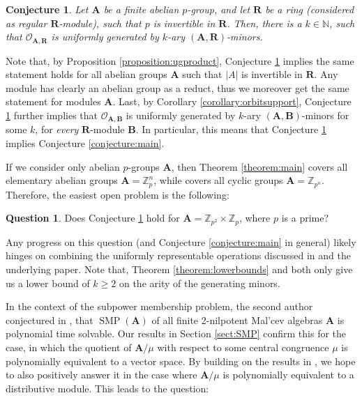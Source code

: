 \documentclass[11pt]{amsart}
\theoremstyle{plain}
\newtheorem{conjecture}[thm]{Conjecture}
\theoremstyle{definition}
\newtheorem{question}[thm]{Question}
\newcommand{\N}{{\mathbb N}}
\newcommand{\Z}{{\mathbb Z}}
\newcommand{\alg}[1]{\mathbf{#1}}
\newcommand{\clonoid}[1]{\mathcal{#1}}
\newcommand{\clodO}{\clonoid{O}}
\newcommand{\algA}{\alg{A}}
\newcommand{\algB}{\alg{B}}
\newcommand{\algR}{\alg{R}}
\DeclareMathOperator{\SMP}{SMP}
\begin{document}
\begin{conjecture} \label{conjecture:strong}
Let $\algA$ be a finite abelian $p$-group, and let $\algR$ be a ring (considered as regular $\algR$-module), such that $p$ is invertible in $\algR$. Then, there is a $k\in \N$, such that $\mathcal O_{\algA,\algR}$ is uniformly generated by $k$-ary $(\algA,\algR)$-minors.
\end{conjecture}

Note that, by Proposition \ref{proposition:ugproduct}, Conjecture \ref{conjecture:strong} implies the same statement holds for all abelian groups $\algA$ such that $|A|$ is invertible in $\algR$. Any module has clearly an abelian group as a reduct, thus we moreover get the same statement for modules $\algA$. Last, by Corollary \ref{corollary:orbitsupport}, Conjecture \ref{conjecture:strong} further implies that $\clodO_{\algA,\algB}$ is uniformly generated by $k$-ary $(\algA,\algB)$-minors for some $k$, for \emph{every} $\algR$-module $\algB$. In particular, this means that Conjecture \ref{conjecture:strong} implies Conjecture \ref{conjecture:main}.

If we consider only abelian $p$-groups $\algA$, then Theorem \ref{theorem:main} covers all elementary abelian groups $\algA = \Z_p^n$, while \cite{MW-clonoidsmodules} covers all cyclic groups $\algA = \Z_{p^n}$. Therefore, the easiest open problem is the following:

\begin{question} \label{question:pgroup}
Does Conjecture \ref{conjecture:strong} hold for $\algA = \Z_{p^2}\times \Z_p$, where $p$ is a prime?
\end{question}

Any progress on this question (and Conjecture \ref{conjecture:main} in general) likely hinges on combining the uniformly representable operations discussed in \cite{MW-clonoidsmodules} and the underlying paper. Note that, Theorem \ref{theorem:lowerbounds} and \cite[Lemma 5.1]{MW-clonoidsmodules} both only give us a lower bound of $k\geq 2$ on the arity of the generating minors.

In the context of the subpower membership problem, the second author conjectured in \cite{kompatscher-SMP2nil}, that $\SMP(\algA)$ of all finite 2-nilpotent Mal'cev algebras $\algA$ is polynomial time solvable. Our results in Section \ref{sect:SMP} confirm this for the case, in which the quotient of $\algA/\mu$ with respect to some central congruence $\mu$ is polynomially equivalent to a vector space. By building on the results in \cite{MW-clonoidsmodules}, we hope to also positively answer it in the case where $\algA/\mu$ is polynomially equivalent to a distributive module. This leads to the question:
\end{document}
